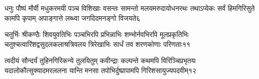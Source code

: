 %
%
%
%
%

\fourlineindentedshlokanum
{धनुः पौष्पं मौर्वी मधुकरमयी पञ्च विशिखाः}
{वसन्तः सामन्तो मलयमरुदायोधनरथः}
{तथाऽप्येकः सर्वं हिमगिरिसुते कामपि कृपाम्}
{अपाङ्गात्ते लब्ध्वा जगदिदमनङ्गो विजयते}{६}

%
%
%

\fourlineindentedshlokanum
{चतुर्भिः श्रीकण्ठैः शिवयुवतिभिः पञ्चभिरपि}
{प्रभिन्नाभिः शम्भोर्नवभिरपि मूलप्रकृतिभिः}
{चतुश्चत्वारिंशद्वसुदलकलाश्रत्रिवलय}
{त्रिरेखाभिः सार्धं तव शरणकोणाः परिणताः}{११}

\fourlineindentedshlokanum
{त्वदीयं सौन्दर्यं तुहिनगिरिकन्ये तुलयितुम्}
{कवीन्द्राः कल्पन्ते कथमपि विरिञ्चिप्रभृतयः}
{यदालोकौत्सुक्यादमरललना यान्ति मनसा}
{तपोभिर्दुष्प्रापामपि गिरिशसायुज्यपदवीम्}{१२}

